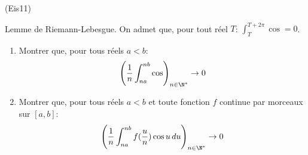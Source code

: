 \begin{tiny}(Eis11)\end{tiny} Lemme de Riemann-Lebesgue.\newline
On admet que, pour tout réel $T$: $\int_{T}^{T+2\pi}\cos = 0$.
\begin{enumerate}
 \item Montrer que, pour tous réels $a<b$:
\begin{displaymath}
 \left(\frac{1}{n}\int_{na}^{nb}\cos \right)_{n\in\N^*} \rightarrow 0
\end{displaymath}
 \item Montrer que, pour tous réels $a<b$ et toute fonction $f$ continue par morceaux sur $[a,b]$:
\begin{displaymath}
 \left(\frac{1}{n}\int_{na}^{nb}f(\frac{u}{n})\cos u\, du \right)_{n\in\N^*} \rightarrow 0
\end{displaymath}
\end{enumerate}
